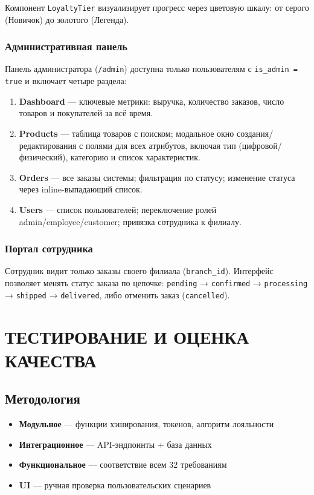 \documentclass[14pt,a4paper]{extreport}
\begin{document}
Компонент \texttt{LoyaltyTier} визуализирует прогресс через цветовую шкалу: от серого (Новичок) до золотого (Легенда).

\subsection{Административная панель}

Панель администратора (\texttt{/admin}) доступна только пользователям с \texttt{is\_admin = true} и включает четыре раздела:

\begin{enumerate}
  \item \textbf{Dashboard} — ключевые метрики: выручка, количество заказов, число товаров и покупателей за всё время.
  \item \textbf{Products} — таблица товаров с поиском; модальное окно создания/редактирования с полями для всех атрибутов, включая тип (цифровой/физический), категорию и список характеристик.
  \item \textbf{Orders} — все заказы системы; фильтрация по статусу; изменение статуса через inline-выпадающий список.
  \item \textbf{Users} — список пользователей; переключение ролей admin\slash{}employee\slash{}customer; привязка сотрудника к филиалу.
\end{enumerate}

\subsection{Портал сотрудника}

Сотрудник видит только заказы своего филиала (\texttt{branch\_id}). Интерфейс позволяет менять статус заказа по цепочке: \texttt{pending} → \texttt{confirmed} → \texttt{processing} → \texttt{shipped} → \texttt{delivered}, либо отменить заказ (\texttt{cancelled}).

\chapter{ТЕСТИРОВАНИЕ И ОЦЕНКА КАЧЕСТВА}

\section{Методология}

\begin{itemize}
  \item \textbf{Модульное} --- функции хэширования, токенов, алгоритм лояльности
  \item \textbf{Интеграционное} --- API-эндпоинты + база данных
  \item \textbf{Функциональное} --- соответствие всем 32 требованиям
  \item \textbf{UI} --- ручная проверка пользовательских сценариев
\end{itemize}
\end{document}
